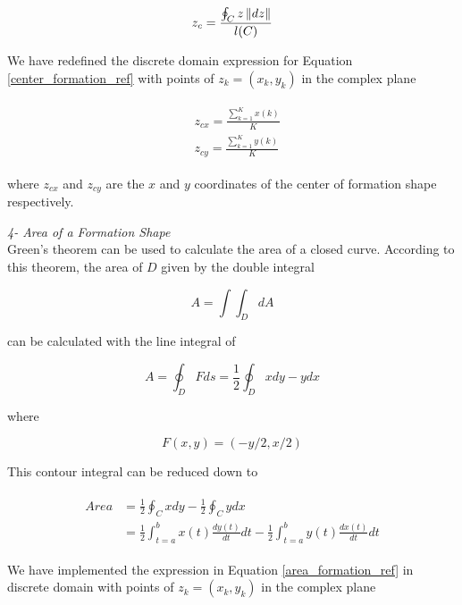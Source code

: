 \begin{equation} \label{center_formation_ref}
 z_c = \frac{\oint_C z\left\lVert dz\right\rVert}{l(C)}
\end{equation}
		
We have redefined the discrete domain expression for Equation \ref{center_formation_ref} with points of  $z_k = (x_k,y_k)$ in the complex plane

\begin{align}
\begin{split}
&z_{cx} = \frac{\sum_{k=1}^{K}x(k)}{K}  \\
&z_{cy} = \frac{\sum_{k=1}^{K}y(k)}{K}  
\end{split}
\end{align}
		
where $z_{cx}$ and $z_{cy}$ are the $x$ and $y$ coordinates of the center of formation shape respectively.

\textit{ 	4- Area of a Formation Shape} \\ 		
Green's theorem can be used to calculate the area of a closed curve. According to this theorem, the area of $D$ given by the double integral \cite{calculus}

\begin{equation}
 A = \int\int_D dA
\end{equation}
		
can be calculated with the line integral of

\begin{equation}
 A = \oint_D F ds = \frac{1}{2} \oint_D xdy - ydx
\end{equation}

where

\begin{equation}
F(x,y) = (-y/2,x/2)
\end{equation}
		
This contour integral can be reduced down to

\begin{align} \label{area_formation_ref}
\begin{split}
Area &= \frac{1}{2} \oint_C xdy - \frac{1}{2} \oint_C ydx \\
&= \frac{1}{2} \int_{t=a}^{b} x(t)\frac{dy(t)}{dt}dt - \frac{1}{2} \int_{t=a}^{b}y(t)\frac{dx(t)}{dt}dt
\end{split}
\end{align}
		
We have implemented the expression in Equation \ref{area_formation_ref} in discrete domain with points of  $z_k = (x_k,y_k)$ in the complex plane
			
